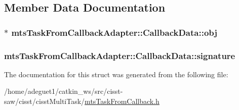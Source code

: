 \subsection{Member Data Documentation}
\hypertarget{structmts_task_from_callback_adapter_1_1_callback_data_aac5b1768783a485fd26f702739f8e28e}{
\subsubsection[{obj}]{$\ast$ mts\-Task\-From\-Callback\-Adapter\-::\-Callback\-Data\-::obj}}\label{structmts_task_from_callback_adapter_1_1_callback_data_aac5b1768783a485fd26f702739f8e28e}
\hypertarget{structmts_task_from_callback_adapter_1_1_callback_data_a657f9a6d041e0ba81dfb27a8610d6650}{
\subsubsection[{signature}]{ mts\-Task\-From\-Callback\-Adapter\-::\-Callback\-Data\-::signature}}\label{structmts_task_from_callback_adapter_1_1_callback_data_a657f9a6d041e0ba81dfb27a8610d6650}


The documentation for this struct was generated from the following file\-:\begin{DoxyCompactItemize}
\item 
/home/adeguet1/catkin\-\_\-ws/src/cisst-\/saw/cisst/cisst\-Multi\-Task/\hyperlink{mts_task_from_callback_8h}{mts\-Task\-From\-Callback.\-h}\end{DoxyCompactItemize}
